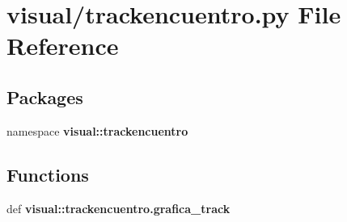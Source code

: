 \section{visual/trackencuentro.py \-File \-Reference}
\label{trackencuentro_8py}
\subsection*{\-Packages}
\begin{DoxyCompactItemize}
\item 
namespace {\bf visual\-::trackencuentro}
\end{DoxyCompactItemize}
\subsection*{\-Functions}
\begin{DoxyCompactItemize}
\item 
def {\bf visual\-::trackencuentro.\-grafica\-\_\-track}
\end{DoxyCompactItemize}
